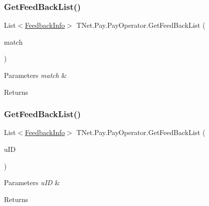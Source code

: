 \subsubsection{\texorpdfstring{Get\+Feed\+Back\+List()}{GetFeedBackList()}\hspace{0.1cm}{\footnotesize\ttfamily [1/2]}}
{\footnotesize\ttfamily List$<$\mbox{\hyperlink{class_t_net_1_1_pay_1_1_feedback_info}{Feedback\+Info}}$>$ T\+Net.\+Pay.\+Pay\+Operator.\+Get\+Feed\+Back\+List (\begin{DoxyParamCaption}\item[{Action$<$ Command\+Filter $>$}]{match }\end{DoxyParamCaption})}






\begin{DoxyParams}{Parameters}
{\em match} & \\
\hline
\end{DoxyParams}
\begin{DoxyReturn}{Returns}

\end{DoxyReturn}
\mbox{\label{class_t_net_1_1_pay_1_1_pay_operator_a59e1c5e6736e216e1a3b93a680720166}} 
\subsubsection{\texorpdfstring{Get\+Feed\+Back\+List()}{GetFeedBackList()}\hspace{0.1cm}{\footnotesize\ttfamily [2/2]}}
{\footnotesize\ttfamily List$<$\mbox{\hyperlink{class_t_net_1_1_pay_1_1_feedback_info}{Feedback\+Info}}$>$ T\+Net.\+Pay.\+Pay\+Operator.\+Get\+Feed\+Back\+List (\begin{DoxyParamCaption}\item[{int}]{u\+ID }\end{DoxyParamCaption})}






\begin{DoxyParams}{Parameters}
{\em u\+ID} & \\
\hline
\end{DoxyParams}
\begin{DoxyReturn}{Returns}

\end{DoxyReturn}
\mbox{\label{class_t_net_1_1_pay_1_1_pay_operator_a994eb07d222a423005156400e5af1f8a}} 
